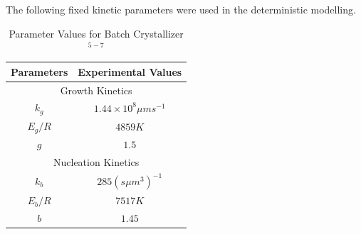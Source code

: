 The following fixed kinetic parameters were used in the deterministic modelling. 

\begin{center}
\begin{table}[!h]
\centering
\begin{tabular}{|c|c|}
\hline
Parameters & Experimental Values \\
\hline
\multicolumn{2}{|c|}{Growth Kinetics} \\
\hline
$k_{g}$ & $1.44\times10^{8} \mu m s^{-1}$ \\
$E_{g}/R$ & $4859K$ \\
$g$ & $1.5$ \\
\hline
\multicolumn{2}{|c|}{Nucleation Kinetics} \\
\hline
$k_{b}$ & $285 (s \mu m^{3})^{-1}$ \\ 
$E_{b}/R$ & $7517K$ \\
$b$ & $1.45$ \\
\hline
\end{tabular}
\caption{Parameter Values for Batch Crystallizer$^{5-7}$}
\label{Table1}
\end{table}
\end{center}

